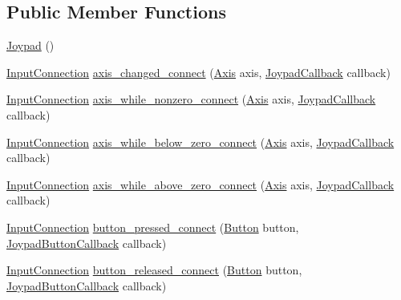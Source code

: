 \subsection*{Public Member Functions}
\begin{DoxyCompactItemize}
\item 
\hyperlink{classkglt_1_1_joypad_abc7f0d927abde1b5149a41f525b3c4f7}{Joypad} ()
\item 
\hyperlink{classkglt_1_1_input_connection}{Input\-Connection} \hyperlink{classkglt_1_1_joypad_a715526edf3cc56bb6048fb5b6a1811c7}{axis\-\_\-changed\-\_\-connect} (\hyperlink{namespacekglt_aacdc540f5eb3041498aaff3012a9a9ec}{Axis} axis, \hyperlink{namespacekglt_aa8de4aa3c6cd3469d4032a4a04761eb6}{Joypad\-Callback} callback)
\item 
\hyperlink{classkglt_1_1_input_connection}{Input\-Connection} \hyperlink{classkglt_1_1_joypad_a740d962716268d37ce5648b83a7d1e72}{axis\-\_\-while\-\_\-nonzero\-\_\-connect} (\hyperlink{namespacekglt_aacdc540f5eb3041498aaff3012a9a9ec}{Axis} axis, \hyperlink{namespacekglt_aa8de4aa3c6cd3469d4032a4a04761eb6}{Joypad\-Callback} callback)
\item 
\hyperlink{classkglt_1_1_input_connection}{Input\-Connection} \hyperlink{classkglt_1_1_joypad_abc76784782677c1e2e78bf4b3e6b3363}{axis\-\_\-while\-\_\-below\-\_\-zero\-\_\-connect} (\hyperlink{namespacekglt_aacdc540f5eb3041498aaff3012a9a9ec}{Axis} axis, \hyperlink{namespacekglt_aa8de4aa3c6cd3469d4032a4a04761eb6}{Joypad\-Callback} callback)
\item 
\hyperlink{classkglt_1_1_input_connection}{Input\-Connection} \hyperlink{classkglt_1_1_joypad_a58f610bab1d4c9ec1231aece587fb9c9}{axis\-\_\-while\-\_\-above\-\_\-zero\-\_\-connect} (\hyperlink{namespacekglt_aacdc540f5eb3041498aaff3012a9a9ec}{Axis} axis, \hyperlink{namespacekglt_aa8de4aa3c6cd3469d4032a4a04761eb6}{Joypad\-Callback} callback)
\item 
\hyperlink{classkglt_1_1_input_connection}{Input\-Connection} \hyperlink{classkglt_1_1_joypad_aca6d996401f2a7866858c2a925ac774e}{button\-\_\-pressed\-\_\-connect} (\hyperlink{namespacekglt_a3a2475e3cbfe8d5c5bf855448b8a91dd}{Button} button, \hyperlink{namespacekglt_a020048fdd1dc93e7e1d1b23662df4d4d}{Joypad\-Button\-Callback} callback)
\item 
\hyperlink{classkglt_1_1_input_connection}{Input\-Connection} \hyperlink{classkglt_1_1_joypad_afbbfe26d9886294c8bd8e8a2d14e4321}{button\-\_\-released\-\_\-connect} (\hyperlink{namespacekglt_a3a2475e3cbfe8d5c5bf855448b8a91dd}{Button} button, \hyperlink{namespacekglt_a020048fdd1dc93e7e1d1b23662df4d4d}{Joypad\-Button\-Callback} callback)
\end{DoxyCompactItemize}
